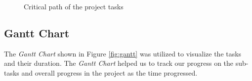 \begin{figure}[ht]
{
    }
    \caption{Critical path of the project tasks}
    \label{fig:critical_path}
\end{figure}





\newpage
\subsection{Gantt Chart}
The \emph{Gantt Chart} shown in Figure \ref{fig:gantt} was utilized to visualize the tasks and their duration. The \emph{Gantt Chart} helped us to track our progress on the sub-tasks and overall progress in the project as the time progressed.

\vspace{5mm}


